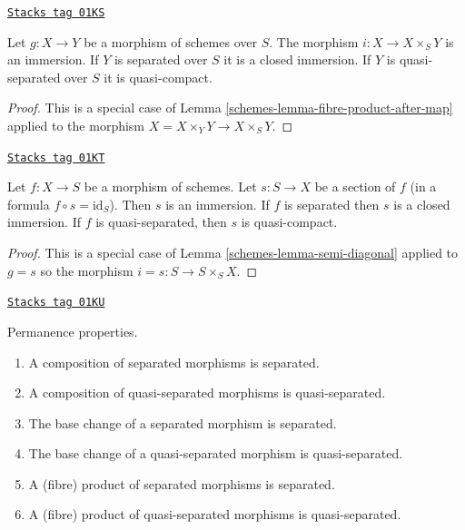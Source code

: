 \begin{lemma}
\label{schemes-lemma-semi-diagonal}
\href{https://stacks.math.columbia.edu/tag/01KS}{\texttt{Stacks tag 01KS}}

Let $g : X \to Y$ be a morphism of schemes over $S$.
The morphism $i : X \to X \times_S Y$ is an immersion.
If $Y$ is separated over $S$ it is a closed immersion.
If $Y$ is quasi-separated over $S$ it is quasi-compact.
\end{lemma}

\begin{proof}

This is a special case of Lemma \ref{schemes-lemma-fibre-product-after-map}
applied to the morphism $X = X \times_Y Y \to X \times_S Y$.
\end{proof}

\begin{lemma}
\label{schemes-lemma-section-immersion}
\href{https://stacks.math.columbia.edu/tag/01KT}{\texttt{Stacks tag 01KT}}

Let $f : X \to S$ be a morphism of schemes.
Let $s : S \to X$ be a section of $f$ (in a formula $f \circ s = \text{id}_S$).
Then $s$ is an immersion.
If $f$ is separated then $s$ is a closed immersion.
If $f$ is quasi-separated, then $s$ is quasi-compact.
\end{lemma}

\begin{proof}

This is a special case of Lemma \ref{schemes-lemma-semi-diagonal} applied to
$g =s$ so the morphism $i = s : S \to S \times_S X$.
\end{proof}

\begin{lemma}
\label{schemes-lemma-separated-permanence}
\href{https://stacks.math.columbia.edu/tag/01KU}{\texttt{Stacks tag 01KU}}

Permanence properties.
\begin{enumerate}
\item A composition of separated morphisms is separated.
\item A composition of quasi-separated morphisms is quasi-separated.
\item The base change of a separated morphism is separated.
\item The base change of a quasi-separated morphism is quasi-separated.
\item A (fibre) product of separated morphisms is separated.
\item A (fibre) product of quasi-separated morphisms is quasi-separated.
\end{enumerate}
\end{lemma}

